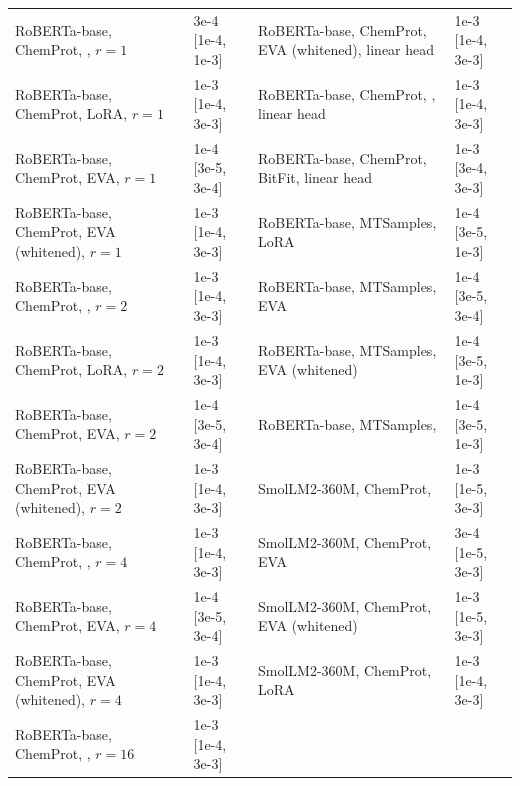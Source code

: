 \begin{table}[!ht]
\begin{tabular}{llll}
RoBERTa-base, ChemProt, \method{}, $r{=}1$ & 3e-4 [1e-4, 1e-3] & RoBERTa-base, ChemProt, EVA (whitened), linear head & 1e-3 [1e-4, 3e-3] \\
RoBERTa-base, ChemProt, LoRA, $r{=}1$ & 1e-3 [1e-4, 3e-3] & RoBERTa-base, ChemProt, \method{}, linear head & 1e-3 [1e-4, 3e-3] \\
RoBERTa-base, ChemProt, EVA, $r{=}1$ & 1e-4 [3e-5, 3e-4] & RoBERTa-base, ChemProt, BitFit, linear head & 1e-3 [3e-4, 3e-3] \\
RoBERTa-base, ChemProt, EVA (whitened), $r{=}1$ & 1e-3 [1e-4, 3e-3] & RoBERTa-base, MTSamples, LoRA & 1e-4 [3e-5, 1e-3] \\
RoBERTa-base, ChemProt, \method{}, $r{=}2$ & 1e-3 [1e-4, 3e-3] & RoBERTa-base, MTSamples, EVA & 1e-4 [3e-5, 3e-4] \\
RoBERTa-base, ChemProt, LoRA, $r{=}2$ & 1e-3 [1e-4, 3e-3] & RoBERTa-base, MTSamples, EVA (whitened) & 1e-4 [3e-5, 1e-3] \\
RoBERTa-base, ChemProt, EVA, $r{=}2$ & 1e-4 [3e-5, 3e-4] & RoBERTa-base, MTSamples, \method{} & 1e-4 [3e-5, 1e-3] \\
RoBERTa-base, ChemProt, EVA (whitened), $r{=}2$ & 1e-3 [1e-4, 3e-3] & SmolLM2-360M, ChemProt, \method{} & 1e-3 [1e-5, 3e-3] \\
RoBERTa-base, ChemProt, \method{}, $r{=}4$ & 1e-3 [1e-4, 3e-3] & SmolLM2-360M, ChemProt, EVA & 3e-4 [1e-5, 3e-3] \\
RoBERTa-base, ChemProt, EVA, $r{=}4$ & 1e-4 [3e-5, 3e-4] & SmolLM2-360M, ChemProt, EVA (whitened) & 1e-3 [1e-5, 3e-3] \\
RoBERTa-base, ChemProt, EVA (whitened), $r{=}4$ & 1e-3 [1e-4, 3e-3] & SmolLM2-360M, ChemProt, LoRA & 1e-3 [1e-4, 3e-3] \\
RoBERTa-base, ChemProt, \method{}, $r{=}16$ & 1e-3 [1e-4, 3e-3] &  &  \\
\bottomrule
\end{tabular}
\end{table}
